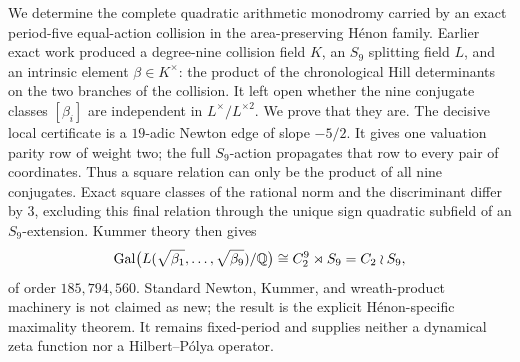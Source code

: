 We determine the complete quadratic arithmetic monodromy carried by an
exact period-five equal-action collision in the area-preserving H\'enon
family.  Earlier exact work produced a degree-nine collision field
\(K\), an \(S_9\) splitting field \(L\), and an intrinsic element
\(\beta\in K^\times\): the product of the chronological Hill determinants
on the two branches of the collision.  It left open whether the nine
conjugate classes \([\beta_i]\) are independent in
\(L^\times/L^{\times2}\).  We prove that they are.  The decisive local
certificate is a \(19\)-adic Newton edge of slope \(-5/2\).  It gives one
valuation parity row of weight two; the full \(S_9\)-action propagates that
row to every pair of coordinates.  Thus a square relation can only be the
product of all nine conjugates.  Exact square classes of the rational norm
and the discriminant differ by \(3\), excluding this final relation through
the unique sign quadratic subfield of an \(S_9\)-extension.  Kummer theory
then gives
\[
 \operatorname{Gal}\bigl(L(\sqrt{\beta_1},\ldots,\sqrt{\beta_9})/\mathbb{Q}\bigr)
 \cong C_2^9\rtimes S_9=C_2\mathbin{\wr} S_9,
\]
of order \(185{,}794{,}560\).  Standard Newton, Kummer, and wreath-product
machinery is not claimed as new; the result is the explicit H\'enon-specific
maximality theorem.  It remains fixed-period and supplies neither a
dynamical zeta function nor a Hilbert--P\'olya operator.
